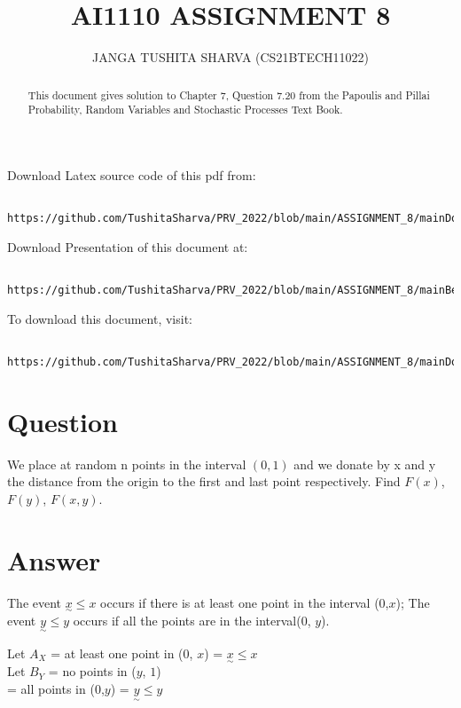 \documentclass[journal,12pt,twocolumn]{IEEEtran}
\begin{document}
    
\title{
	AI1110 ASSIGNMENT 8
}
\author{ JANGA TUSHITA SHARVA (CS21BTECH11022)%
}	

\maketitle


\begin{abstract}
This document gives solution to Chapter 7, Question 7.20 from the Papoulis and Pillai Probability, Random Variables and Stochastic Processes Text Book.
\end{abstract}

Download Latex source code of this pdf from: 
\begin{lstlisting}
    https://github.com/TushitaSharva/PRV_2022/blob/main/ASSIGNMENT_8/mainDoc.tex
\end{lstlisting}

Download Presentation of this document at:
\begin{lstlisting}
    https://github.com/TushitaSharva/PRV_2022/blob/main/ASSIGNMENT_8/mainBeamer.pdf
\end{lstlisting}

To download this document, visit: 
\begin{lstlisting}
    https://github.com/TushitaSharva/PRV_2022/blob/main/ASSIGNMENT_8/mainDoc.pdf
\end{lstlisting}

\section{Question}
We place at random n points in the interval $(0,1)$ and we donate by x and y the distance from the origin to the first and last point respectively. Find $F(x)$, $F(y)$, $F(x,y)$.

\section{Answer}

The event {${\underset{\sim}{x}\leq x}$} occurs if there is at least one point in the interval ($0$,$x$); The event {${\underset{\sim}{y}\leq y}$} occurs if all the points are in the interval($0$, $y$).

    Let $A_X$ = {at least one point in ($0$, $x$)} = {$\underset{\sim}{x} \leq x$}\\
    Let $B_Y$ = no points in ($y$, $1$) \\ 
    = all points in ($0$,$y$) = $\underset{\sim}{y} \leq y$
\end{document}
